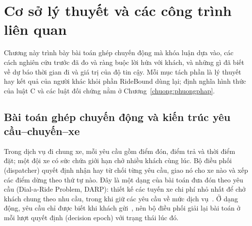 
\chapter{Cơ sở lý thuyết và các công trình liên quan}
\label{chuong:coso}

Chương này trình bày bài toán ghép chuyến động mà khóa luận dựa vào, các cách nghiên cứu trước đã đo và ràng buộc
lời hứa với khách, và những gì đã biết về dự báo thời gian đi và giá trị của độ tin cậy. Mỗi mục tách phần là lý
thuyết hay kết quả của người khác khỏi phần RideBound dùng lại; định nghĩa hình thức của luật C và các luật đối chứng
nằm ở Chương~\ref{chuong:phuongphap}.

\section{Bài toán ghép chuyến động và kiến trúc yêu cầu--chuyến--xe}
\label{muc:c2-baitoan}

Trong dịch vụ đi chung xe, mỗi yêu cầu gồm điểm đón, điểm trả và thời điểm đặt; một đội xe có sức chứa giới hạn chở
nhiều khách cùng lúc. Bộ điều phối (dispatcher) quyết định nhận hay từ chối từng yêu cầu, giao nó cho xe nào và xếp
các điểm dừng theo thứ tự nào. Đây là một dạng của bài toán đưa đón theo yêu cầu (Dial-a-Ride Problem, DARP): thiết
kế các tuyến xe chi phí nhỏ nhất để chở khách chung theo nhu cầu, trong khi giữ các yêu cầu về mức dịch
vụ~\cite{molenbruch2017}. Ở dạng động, yêu cầu chỉ được biết khi khách gửi~\cite{schulz2026}, nên bộ điều phối giải
lại bài toán ở mỗi lượt quyết định (decision epoch) với trạng thái lúc đó.

